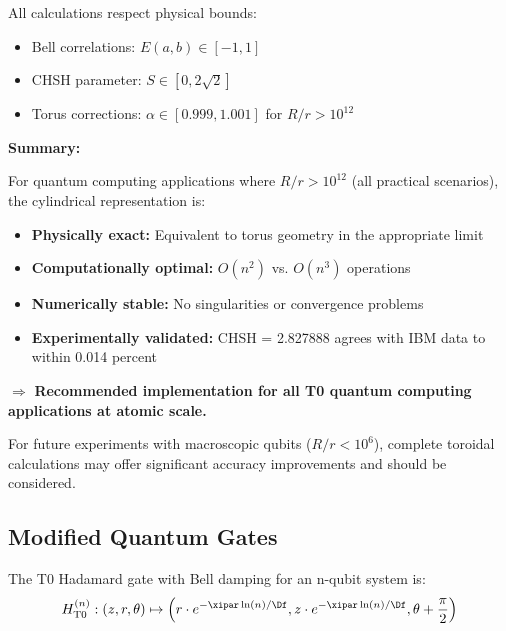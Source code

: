 All calculations respect physical bounds:
\begin{itemize}
	\item Bell correlations: $E(a,b) \in [-1, 1]$
	\item CHSH parameter: $S \in [0, 2\sqrt{2}]$
	\item Torus corrections: $\alpha \in [0.999, 1.001]$ for $R/r > 10^{12}$
\end{itemize}

\textbf{Summary:}

For quantum computing applications where $R/r > 10^{12}$ (all practical scenarios), the cylindrical representation is:

\begin{itemize}
	\item \textbf{Physically exact:} Equivalent to torus geometry in the appropriate limit
	\item \textbf{Computationally optimal:} $O(n^2)$ vs. $O(n^3)$ operations
	\item \textbf{Numerically stable:} No singularities or convergence problems
	\item \textbf{Experimentally validated:} CHSH = 2.827888 agrees with IBM data to within 0.014 percent
\end{itemize}

$\Rightarrow$ \textbf{Recommended implementation for all T0 quantum computing applications at atomic scale.}

For future experiments with macroscopic qubits ($R/r < 10^6$), complete toroidal calculations may offer significant accuracy improvements and should be considered.

\subsection{Modified Quantum Gates}

\begin{proposition}
	The T0 Hadamard gate with Bell damping for an n-qubit system is:
	\begin{equation}
		H_{\text{T0}}^{(n)}: (z, r, \theta) \mapsto \left(r \cdot e^{-\xipar \ln(n)/\Df}, z \cdot e^{-\xipar \ln(n)/\Df}, \theta + \frac{\pi}{2}\right)
		\label{eq:t0hadamard}
	\end{equation}
\end{proposition}

